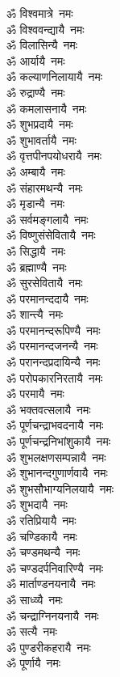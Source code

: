 \begin{multicols}{2}
\begin{flushleft}
ॐ विश्वमात्रे~नमः\\
ॐ विश्ववन्द्यायै~नमः\\
ॐ विलासिन्यै~नमः\\
ॐ आर्यायै~नमः\\
ॐ कल्याणनिलायायै~नमः\\
ॐ रुद्राण्यै~नमः\\
ॐ कमलासनायै~नमः\\
ॐ शुभप्रदायै~नमः\\
ॐ शुभावर्तायै~नमः\\
ॐ वृत्तपीनपयोधरायै~नमः\hfill{}\\
ॐ अम्बायै~नमः\\
ॐ संहारमथन्यै~नमः\\
ॐ मृडान्यै~नमः\\
ॐ सर्वमङ्गलायै~नमः\\
ॐ विष्णुसंसेवितायै~नमः\\
ॐ सिद्धायै~नमः\\
ॐ ब्रह्माण्यै~नमः\\
ॐ सुरसेवितायै~नमः\\
ॐ परमानन्ददायै~नमः\\
ॐ शान्त्यै~नमः\hfill{}\\
ॐ परमानन्दरूपिण्यै~नमः\\
ॐ परमानन्दजनन्यै~नमः\\
ॐ परानन्दप्रदायिन्यै~नमः\\
ॐ परोपकारनिरतायै~नमः\\
ॐ परमायै~नमः\\
ॐ भक्तवत्सलायै~नमः\\
ॐ पूर्णचन्द्राभवदनायै~नमः\\
ॐ पूर्णचन्द्रनिभांशुकायै~नमः\\
ॐ शुभलक्षणसम्पन्नायै~नमः\\
ॐ शुभानन्दगुणार्णवायै~नमः\hfill{}\\
ॐ शुभसौभाग्यनिलयायै~नमः\\
ॐ शुभदायै~नमः\\
ॐ रतिप्रियायै~नमः\\
ॐ चण्डिकायै~नमः\\
ॐ चण्डमथन्यै~नमः\\
ॐ चण्डदर्पनिवारिण्यै~नमः\\
ॐ मार्ताण्डनयनायै~नमः\\
ॐ साध्व्यै~नमः\\
ॐ चन्द्राग्निनयनायै~नमः\\
ॐ सत्यै~नमः\hfill{}\\
ॐ पुण्डरीकहरायै~नमः\\
ॐ पूर्णायै~नमः\\

\end{flushleft}
\end{multicols}
